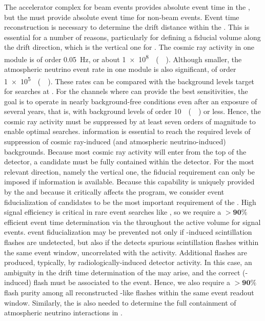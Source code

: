 The accelerator complex for beam events provides absolute event time in the \dune {}, but the  must provide absolute event time for non-beam events. Event time reconstruction is necessary to determine the drift distance within the . This is essential for a number of reasons, particularly for defining a fiducial volume along the  drift direction, which is the vertical one for . The cosmic ray activity in one  module is of order \SI{0.05}{\Hz}, or about \SI{1e8}{\per(\Mtyr)}. Although smaller, the atmospheric neutrino event rate in one  module is also significant, of order \SI{1e5}{\per(\Mtyr)}. These rates can be compared with the background levels target for  searches at \dune. For the  channels where \dune can provide the best sensitivities, the goal is to operate in nearly background-free conditions even after an exposure of several years, that is, with background levels of order \SI{10}{\per(\Mtyr)} or less. Hence, the cosmic ray activity must be suppressed by at least seven orders of magnitude to enable optimal  searches.  information is essential to reach the required levels of suppression of cosmic ray-induced (and atmospheric neutrino-induced) backgrounds. Because most cosmic ray activity will enter from the top of the detector, a  candidate must be fully contained within the detector. For the most relevant direction, namely the vertical one, the fiducial requirement can only be imposed if  information is available. Because this capability is uniquely provided by the  and because it critically affects the  program,  we consider event fiducialization of  candidates to be the most important requirement of the . High signal efficiency is critical in rare event searches like , so we require a $\boldsymbol{>90\%}$ efficient event time determination via the  throughout the  active volume for  signal events.  event fiducialization may be prevented not only if -induced  scintillation flashes are undetected, but also if the  detects spurious  scintillation flashes within the same event window, uncorrelated with the  activity. Additional flashes are produced, typically, by radiologically-induced detector activity. In this case, an ambiguity in the drift time determination of the  may arise, and the correct (-induced) flash must be associated to the event. Hence, we also require a $\boldsymbol{>90\%}$  flash purity among all reconstructed -like flashes within the same  event readout window. Similarly, the  is also needed to determine the full containment of atmospheric neutrino interactions in \dune.
 
